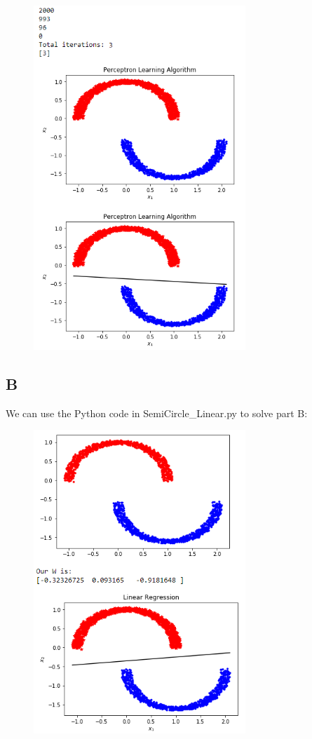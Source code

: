 \documentclass[a4paper]{article}
\begin{document}
\begin{figure}[h]
  \begin{center}
    \includegraphics[width=80mm,scale=0.8]{problem3_1a.png}
  \end{center}
\end{figure}

\newpage

\subsection{B}
We can use the Python code in SemiCircle\_Linear.py to solve part B:

\begin{figure}[h]
  \begin{center}
    \includegraphics[width=80mm,scale=0.8]{problem3_1b.png}
  \end{center}
\end{figure}
\end{document}
